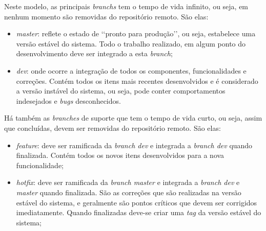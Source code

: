 Neste modelo, as principais \textit{branchs} tem o tempo de vida infinito, ou seja,
em nenhum momento são removidas do repositório remoto. São elas:

\begin{itemize}
  \item \textit{master}: reflete o estado de \lq\lq pronto para produção\rq\rq,
    ou seja, estabelece uma versão estável do sistema. Todo
    o trabalho realizado, em algum ponto do desenvolvimento
    deve ser integrado a esta \textit{branch};
  \item \textit{dev}: onde ocorre a integração de todos os componentes,
    funcionalidades e correções. Contém todos os itens mais
    recentes desenvolvidos e é considerado a versão instável
    do sistema, ou seja, pode conter comportamentos indesejados
    e \textit{bugs} desconhecidos.
\end{itemize}

Há também as \textit{branches} de suporte que tem o tempo de vida curto, ou seja,
assim que concluídas, devem ser removidas do repositório remoto. São
elas:

\begin{itemize}
  \item \textit{feature}: deve ser ramificada da \textit{branch dev} e
    integrada a \textit{branch dev} quando finalizada. Contém todos os
    novos itens desenvolvidos para a nova funcionalidade;
  \item \textit{hotfix}: deve ser ramificada da \textit{branch master} e
    integrada a \textit{branch dev} e \textit{master} quando finalizada. São
    as correções que são realizadas na versão estável do sistema, e geralmente
    são pontos críticos que devem ser corrigidos imediatamente. Quando finalizadas
    deve-se criar uma \textit{tag} da versão estável do sistema;
\end{itemize}
